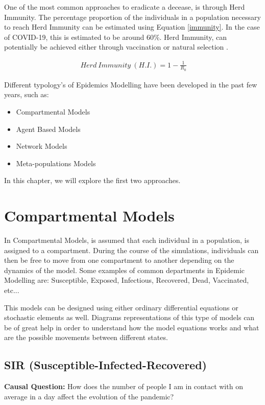 One of the most common approaches to eradicate a decease, is through Herd Immunity. The percentage proportion of the individuals in a population necessary to reach Herd Immunity can be estimated using Equation \ref{immunity}. In the case of COVID-19, this is estimated to be around 60\%. Herd Immunity, can potentially be achieved either through vaccination or natural selection \cite{blob}.

\useshortskip
\begin{align}
\ Herd\:Immunity\:(H.I.) = 1 - \frac{1}{R_{0}}
\label{immunity}
\end{align}
\useshortskip

Different typology's of Epidemics Modelling have been developed in the past few years, such as:
\begin{itemize}
    \setlength\itemsep{-0.3cm}
    \item Compartmental Models
    \item Agent Based Models
    \item Network Models
    \item Meta-populations Models
\end{itemize}

In this chapter, we will explore the first two approaches.

\section{Compartmental Models}

In Compartmental Models, is assumed that each individual in a population, is assigned to a compartment. During the course of the simulations, individuals can then be free to move from one compartment to another depending on the dynamics of the model. Some examples of common departments in Epidemic Modelling are: Susceptible, Exposed, Infectious, Recovered, Dead, Vaccinated, etc...

This models can be designed using either ordinary differential equations or stochastic elements as well. Diagrams representations of this type of models can be of great help in order to understand how the model equations works and what are the possible movements between different states. 

\subsection{SIR (Susceptible-Infected-Recovered)}

\textbf{Causal Question:} How does the number of people I am in contact with on average in a day affect the evolution of the pandemic?

